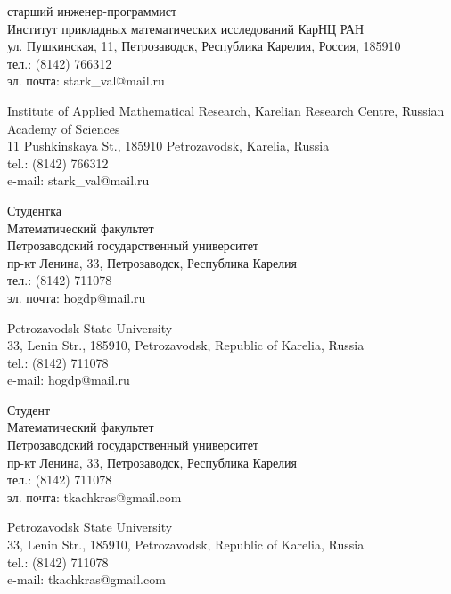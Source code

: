\documentclass{article}
\begin{document}
\begin{aboutauthors}
старший инженер-программист\\ 
Институт прикладных математических исследований КарНЦ РАН\\ 
ул. Пушкинская, 11, Петрозаводск, Республика Карелия, Россия, 185910\\
тел.: (8142) 766312\\
эл. почта: stark\_val@mail.ru

\columnbreak

Institute of Applied Mathematical Research, Karelian Research Centre, Russian Academy of Sciences\\
11 Pushkinskaya St., 185910 Petrozavodsk, Karelia, Russia\\
tel.: (8142) 766312\\
e-mail: stark\_val@mail.ru 
\end{aboutauthors}

\begin{aboutauthors}
Студентка\\
Математический факультет\\ 
Петрозаводский государственный университет\\
пр-кт Ленина, 33, Петрозаводск, Республика Карелия\\
тел.: (8142) 711078\\
эл. почта: hogdp@mail.ru

\columnbreak

Petrozavodsk State University\\
33, Lenin Str., 185910, Petrozavodsk, Republic of Karelia, Russia\\
tel.: (8142) 711078\\
e-mail: hogdp@mail.ru
\end{aboutauthors}

\begin{aboutauthors}
Студент\\
Математический факультет\\ 
Петрозаводский государственный университет\\
пр-кт Ленина, 33, Петрозаводск, Республика Карелия\\
тел.: (8142) 711078\\
эл. почта: tkachkras@gmail.com

\columnbreak

Petrozavodsk State University\\
33, Lenin Str., 185910, Petrozavodsk, Republic of Karelia, Russia\\
tel.: (8142) 711078\\
e-mail: tkachkras@gmail.com 
\end{aboutauthors}
\end{document}
